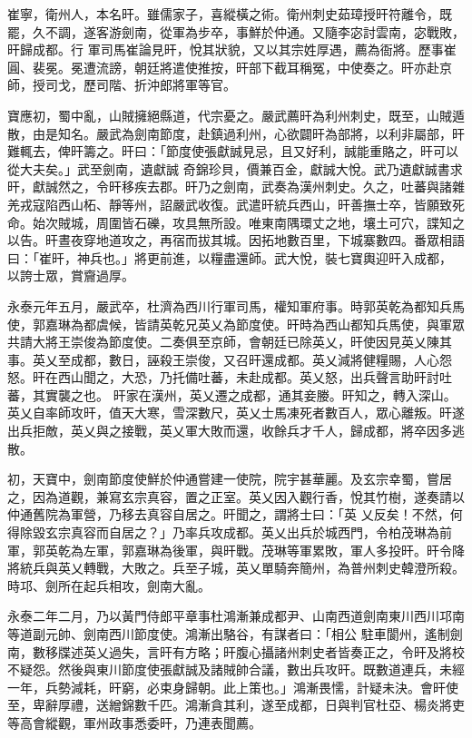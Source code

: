 \begin{pinyinscope}
 崔寧，衛州人，本名旰。雖儒家子，喜縱橫之術。衛州刺史茹璋授旰符離令，既罷，久不調，遂客游劍南，從軍為步卒，事鮮於仲通。又隨李宓討雲南，宓戰敗，旰歸成都。行
 軍司馬崔論見旰，悅其狀貌，又以其宗姓厚遇，薦為衙將。歷事崔圓、裴冕。冕遭流謗，朝廷將遣使推按，旰部下截耳稱冤，中使奏之。旰亦赴京師，授司戈，歷司階、折沖郎將軍等官。



 寶應初，蜀中亂，山賊擁絕縣道，代宗憂之。嚴武薦旰為利州刺史，既至，山賊遁散，由是知名。嚴武為劍南節度，赴鎮過利州，心欲闢旰為部將，以利非屬部，旰難輒去，俾旰籌之。旰曰：「節度使張獻誠見忌，且又好利，誠能重賂之，旰可以從大夫矣。」武至劍南，遺獻誠
 奇錦珍貝，價兼百金，獻誠大悅。武乃遺獻誠書求旰，獻誠然之，令旰移疾去郡。旰乃之劍南，武奏為漢州刺史。久之，吐蕃與諸雜羌戎寇陷西山柘、靜等州，詔嚴武收復。武遣旰統兵西山，旰善撫士卒，皆願致死命。始次賊城，周圍皆石礫，攻具無所設。唯東南隅環丈之地，壤土可穴，諜知之以告。旰晝夜穿地道攻之，再宿而拔其城。因拓地數百里，下城寨數四。番眾相語曰：「崔旰，神兵也。」將更前進，以糧盡還師。武大悅，裝七寶輿迎旰入成都，
 以誇士眾，賞齎過厚。



 永泰元年五月，嚴武卒，杜濟為西川行軍司馬，權知軍府事。時郭英乾為都知兵馬使，郭嘉琳為都虞候，皆請英乾兄英乂為節度使。旰時為西山都知兵馬使，與軍眾共請大將王崇俊為節度使。二奏俱至京師，會朝廷已除英乂，旰使因見英乂陳其事。英乂至成都，數日，誣殺王崇俊，又召旰還成都。英乂減將健糧賜，人心怨怒。旰在西山聞之，大恐，乃托備吐蕃，未赴成都。英乂怒，出兵聲言助旰討吐蕃，其實襲之也。
 旰家在漢州，英乂遷之成都，通其妾媵。旰知之，轉入深山。英乂自率師攻旰，值天大寒，雪深數尺，英乂士馬凍死者數百人，眾心離叛。旰遂出兵拒敵，英乂與之接戰，英乂軍大敗而還，收餘兵才千人，歸成都，將卒因多逃散。



 初，天寶中，劍南節度使鮮於仲通嘗建一使院，院宇甚華麗。及玄宗幸蜀，嘗居之，因為道觀，兼寫玄宗真容，置之正室。英乂因入觀行香，悅其竹樹，遂奏請以仲通舊院為軍營，乃移去真容自居之。旰聞之，謂將士曰：「英
 乂反矣！不然，何得除毀玄宗真容而自居之？」乃率兵攻成都。英乂出兵於城西門，令柏茂琳為前軍，郭英乾為左軍，郭嘉琳為後軍，與旰戰。茂琳等軍累敗，軍人多投旰。旰令降將統兵與英乂轉戰，大敗之。兵至子城，英乂單騎奔簡州，為普州刺史韓澄所殺。時邛、劍所在起兵相攻，劍南大亂。



 永泰二年二月，乃以黃門侍郎平章事杜鴻漸兼成都尹、山南西道劍南東川西川邛南等道副元帥、劍南西川節度使。鴻漸出駱谷，有謀者曰：「相公
 駐車閬州，遙制劍南，數移牒述英乂過失，言旰有方略；旰腹心攝諸州刺史者皆奏正之，令旰及將校不疑怨。然後與東川節度使張獻誠及諸賊帥合議，數出兵攻旰。既數道連兵，未經一年，兵勢減耗，旰窮，必束身歸朝。此上策也。」鴻漸畏懦，計疑未決。會旰使至，卑辭厚禮，送繒錦數千匹。鴻漸貪其利，遂至成都，日與判官杜亞、楊炎將吏等高會縱觀，軍州政事悉委旰，乃連表聞薦。




\end{pinyinscope}
